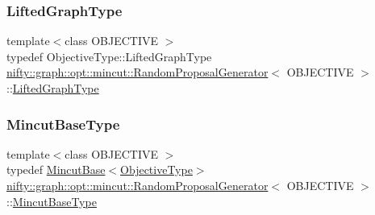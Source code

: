 \mbox{\label{classnifty_1_1graph_1_1opt_1_1mincut_1_1RandomProposalGenerator_a8c15110181b27dea41d65bc6810ba98a}} 
\subsubsection{\texorpdfstring{Lifted\+Graph\+Type}{LiftedGraphType}}
{\footnotesize\ttfamily template$<$class O\+B\+J\+E\+C\+T\+I\+VE $>$ \\
typedef Objective\+Type\+::\+Lifted\+Graph\+Type \hyperlink{classnifty_1_1graph_1_1opt_1_1mincut_1_1RandomProposalGenerator}{nifty\+::graph\+::opt\+::mincut\+::\+Random\+Proposal\+Generator}$<$ O\+B\+J\+E\+C\+T\+I\+VE $>$\+::\hyperlink{classnifty_1_1graph_1_1opt_1_1mincut_1_1ProposalGeneratorBase_ab034c7564972906e2f6e7ca9c0a68437}{Lifted\+Graph\+Type}}

\mbox{\label{classnifty_1_1graph_1_1opt_1_1mincut_1_1RandomProposalGenerator_adf35b5667e7c1cc4a507e7df15657415}} 
\subsubsection{\texorpdfstring{Mincut\+Base\+Type}{MincutBaseType}}
{\footnotesize\ttfamily template$<$class O\+B\+J\+E\+C\+T\+I\+VE $>$ \\
typedef \hyperlink{classnifty_1_1graph_1_1opt_1_1mincut_1_1MincutBase}{Mincut\+Base}$<$\hyperlink{classnifty_1_1graph_1_1opt_1_1mincut_1_1RandomProposalGenerator_af6ef802093e4de20535c753d90f85d89}{Objective\+Type}$>$ \hyperlink{classnifty_1_1graph_1_1opt_1_1mincut_1_1RandomProposalGenerator}{nifty\+::graph\+::opt\+::mincut\+::\+Random\+Proposal\+Generator}$<$ O\+B\+J\+E\+C\+T\+I\+VE $>$\+::\hyperlink{classnifty_1_1graph_1_1opt_1_1mincut_1_1ProposalGeneratorBase_a2fd9fae5a15ac34ddfffaa2c36e48b7a}{Mincut\+Base\+Type}}

